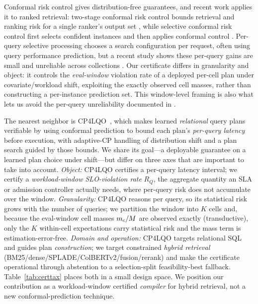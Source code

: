 Conformal risk control gives distribution-free guarantees, and recent work applies it to ranked retrieval: two-stage conformal risk control bounds retrieval and ranking risk for a single ranker's output set \cite{angelopoulos2024twostagecrc}, while selective conformal risk control first selects confident instances and then applies conformal control \cite{xu2025selectiveCRC}. Per-query selective processing chooses a search configuration per request, often using query performance prediction, but a recent study shows these per-query gains are small and unreliable across collections \cite{qpplimits2025,selectiveqp2024}. Our certificate differs in granularity and object: it controls the \emph{eval-window} violation rate of a deployed per-cell plan under covariate/workload shift, exploiting the exactly observed cell masses, rather than constructing a per-instance prediction set. This window-level framing is also what lets us avoid the per-query unreliability documented in \cite{qpplimits2025}.

The nearest neighbor is CP4LQO~\cite{cp4lqo2025}, which makes learned \emph{relational} query plans verifiable by using conformal prediction to bound each plan's \emph{per-query latency} before execution, with adaptive-CP handling of distribution shift and a plan search guided by those bounds. We share its goal---a deployable guarantee on a learned plan choice under shift---but differ on three axes that are important to take into account. \emph{Object:} CP4LQO certifies a per-query latency interval; we certify a \emph{workload-window SLO-violation rate} $R_Q$, the aggregate quantity an SLA or admission controller actually needs, where per-query risk does not accumulate over the window. \emph{Granularity:} CP4LQO reasons per query, so its statistical risk grows with the number of queries; we partition the window into $K$ cells and, because the eval-window cell masses $m_c/M$ are observed exactly (transductive), only the $K$ within-cell expectations carry statistical risk and the mass term is estimation-error-free. \emph{Domain and operation:} CP4LQO targets relational SQL and guides plan \emph{construction}; we target constrained \emph{hybrid retrieval} (BM25/dense/SPLADE/ColBERTv2/fusion/rerank) and make the certificate operational through abstention to a selection-split feasibility-best fallback. Table~\ref{tab:certtax} places both in a small design space. We position our contribution as a workload-window certified \emph{compiler} for hybrid retrieval, not a new conformal-prediction technique.

